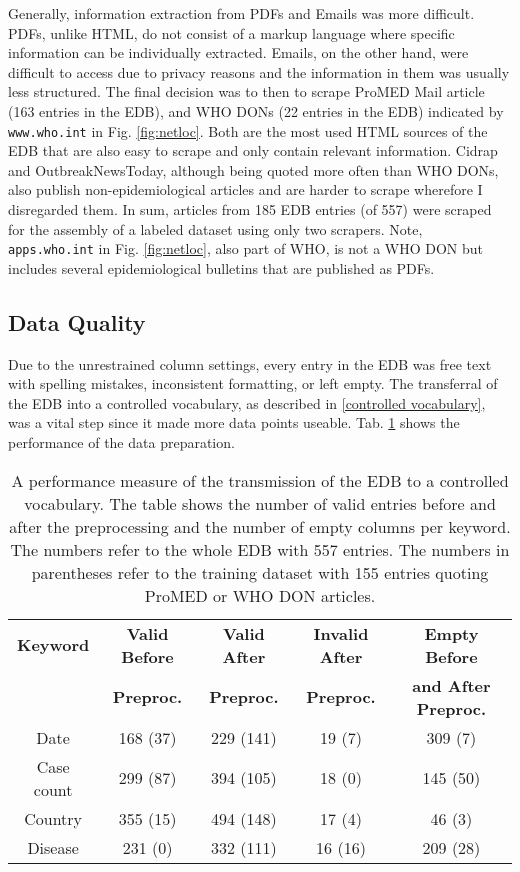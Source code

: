   Generally, information extraction from PDFs and Emails was more difficult.
  PDFs, unlike HTML, do not consist of a markup language where specific information can be individually extracted.
  Emails, on the other hand, were difficult to access due to privacy reasons and the information in them was usually less structured.
  The final decision was to then to scrape ProMED Mail article (163 entries in the EDB), and WHO DONs (22 entries in the EDB) indicated by \texttt{www.who.int} in Fig. \ref{fig:netloc}.
  Both are the most used HTML sources of the EDB that are also easy to scrape and only contain relevant information.
  Cidrap and OutbreakNewsToday, although being quoted more often than WHO DONs, also publish non-epidemiological articles and are harder to scrape wherefore I disregarded them.
  In sum, articles from 185 EDB entries (of 557) were scraped for the assembly of a labeled dataset using only two scrapers.
  Note, \texttt{apps.who.int} in Fig. \ref{fig:netloc}, also part of WHO, is not a WHO DON but includes several epidemiological bulletins that are published as PDFs.

\subsection{Data Quality}
  Due to the unrestrained column settings, every entry in the EDB was free text with spelling mistakes, inconsistent formatting, or left empty.
  The transferral of the EDB into a controlled vocabulary, as described in \ref{controlled vocabulary}, was a vital step since it made more data points useable.
  Tab. \ref{table:preprocessing performance} shows the performance of the data preparation.
  \begin{table}[h!]
    \centering
    \caption{A performance measure of the transmission of the EDB to a controlled vocabulary. The table shows the number of valid entries before and after the preprocessing and the number of empty columns per keyword. The numbers refer to the whole EDB with 557 entries. The numbers in parentheses refer to the training dataset with 155 entries quoting ProMED or WHO DON articles.}
    \begin{tabular}{@{}ccccc@{}}
      \toprule
      \textbf{Keyword} & \textbf{Valid Before} & \textbf{Valid After} & \textbf{Invalid After} & \textbf{Empty Before} \\
      & \textbf{Preproc.} & \textbf{Preproc.} & \textbf{Preproc.} &\textbf{and After Preproc.} \\
      \midrule
      Date& 168 (37)& 229 (141)& 19 (7)& 309 (7) \\
      Case count& 299 (87)& 394 (105)& 18 (0)& 145 (50) \\
      Country& 355 (15) & 494 (148) & 17 (4)& 46 (3) \\
      Disease& 231 (0) & 332 (111)& 16 (16)& 209 (28) \\
      \bottomrule
    \end{tabular}
  \label{table:preprocessing performance}
  \end{table}

